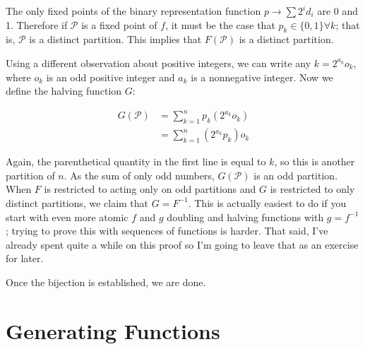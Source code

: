 \documentclass{book}
\numberwithin{equation}{section}
\begin{document}
\begin{enumerate}[label={7.\arabic*}]
The only fixed points of the binary representation function $p \to \sum 2^i d_i$ are 0 and 1. Therefore if $\mathcal{P}$
is a fixed point of $f$, it must be the case that $p_k \in \{0, 1\} \forall k$; that is, $\mathcal{P}$ is a distinct partition.
This implies that $F(\mathcal{P})$ is a distinct partition.

Using a different observation about positive integers, we can write any $k = 2^{a_k}o_k$, where $o_k$ is an
odd positive integer and $a_k$ is a nonnegative integer. Now we define the halving function $G$:

\begin{align*}
G(\mathcal{P}) & = \sum_{k=1}^n p_k (2^{a_k}o_k) \\
& = \sum_{k=1}^n (2^{a_k}p_k)o_k
\end{align*}

Again, the parenthetical quantity in the first line is equal to $k$, so this is another partition of $n$. As the sum
of only odd numbers, $G(\mathcal{P})$ is an odd partition. When $F$ is restricted to acting only on odd partitions
and $G$ is restricted to only distinct partitions, we claim that $G = F^{-1}$. This is actually easiest to do if you start
with even more atomic $f$ and $g$ doubling and halving functions with $g = f^{-1}$; trying to prove this with
sequences of functions is harder. That said, I've already spent quite a while on this proof so I'm going to leave that
as an exercise for later.

Once the bijection is established, we are done.

\end{enumerate}

\chapter{Generating Functions}
\end{document}
